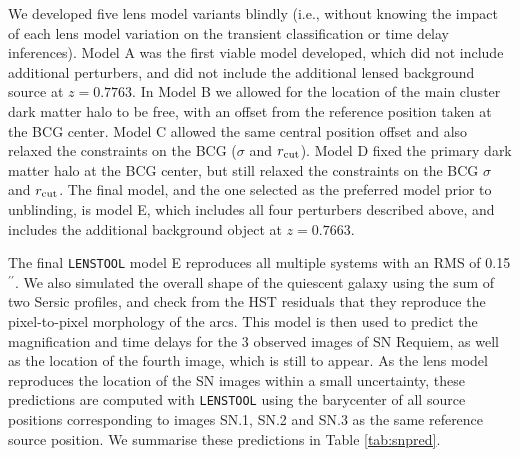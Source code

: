 \documentclass[12pt,dvipsnames]{article}
\gdef\arcsec{$^{\prime\prime}$}
\def\SNABC{SN Requiem\xspace}
\def\lenstool{{\tt LENSTOOL}\xspace}
\begin{document}
We developed five lens model variants blindly (i.e., without knowing the impact of each lens model variation on the transient classification or time delay inferences). Model A was the first viable model developed, which did not include additional perturbers, and did not include the additional lensed background source at $z=0.7763$.   In Model B we allowed for the location of the main cluster dark matter halo to be free, with an offset from the reference position taken at the BCG center.  Model C allowed the same central position offset and also relaxed the constraints on the BCG ($\sigma$ and $r_{\rm cut}$).  Model D fixed the primary dark matter halo at the BCG center, but still relaxed the constraints on the BCG $\sigma$ and $r_{\rm cut}$.
The final model, and the one selected as the preferred model prior to unblinding, is model E, which includes all four perturbers described above, and includes the additional background object at $z=0.7663$.

The final \lenstool model E reproduces all multiple systems with an RMS of 0.15\arcsec. We also simulated the overall shape of the quiescent galaxy using the sum of two Sersic profiles, and check from the HST residuals that they reproduce the pixel-to-pixel morphology of the arcs. This model is then used to predict the magnification and time delays for the 3 observed images of \SNABC, as well as the location of the fourth  image, which is still to appear. As the lens model reproduces the location of the SN images within a small uncertainty, these predictions are computed with \lenstool using the barycenter of all source positions corresponding to images SN.1, SN.2 and SN.3 as the same reference source position. We summarise these predictions in Table \ref{tab:snpred}.
\end{document}
